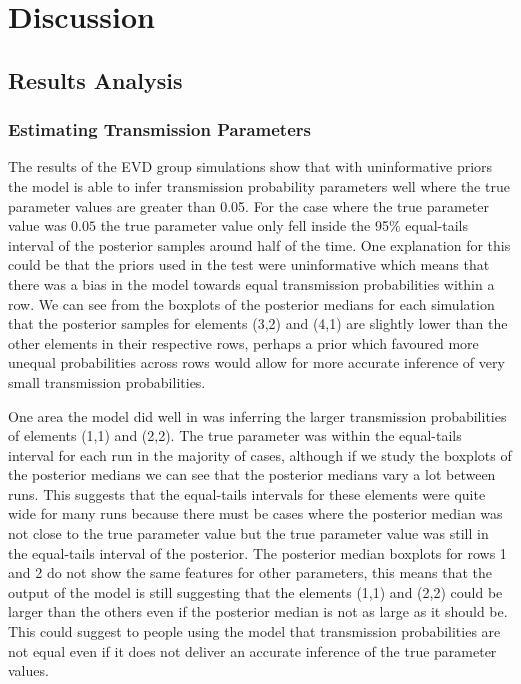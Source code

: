 \documentclass[11pt,a4paper]{report}
\begin{document}
\chapter{Discussion}
\section{Results Analysis}
\subsection{Estimating Transmission Parameters}
The results of the EVD group simulations show that with uninformative priors the model is able to infer transmission probability parameters well where the true parameter values are greater than 0.05. For the case where the true parameter value was $0.05$ the true parameter value only fell inside the 95\% equal-tails interval of the posterior samples around half of the time. One explanation for this could be that the priors used in the test were uninformative which means that there was a bias in the model towards equal transmission probabilities within a row. We can see from the boxplots of the posterior medians for each simulation that the posterior samples for elements (3,2) and (4,1) are slightly lower than the other elements in their respective rows, perhaps a prior which favoured more unequal probabilities across rows would allow for more accurate inference of very small transmission probabilities.

One area the model did well in was inferring the larger transmission probabilities of elements (1,1) and (2,2). The true parameter was within the equal-tails interval for each run in the majority of cases, although if we study the boxplots of the posterior medians we can see that the posterior medians vary a lot between runs. This suggests that the equal-tails intervals for these elements were quite wide for many runs because there must be cases where the posterior median was not close to the true parameter value but the true parameter value was still in the equal-tails interval of the posterior. The posterior median boxplots for rows 1 and 2 do not show the same features for other parameters, this means that the output of the model is still suggesting that the elements (1,1) and (2,2) could be larger than the others even if the posterior median is not as large as it should be. This could suggest to people using the model that transmission probabilities are not equal even if it does not deliver an accurate inference of the true parameter values.
\end{document}
